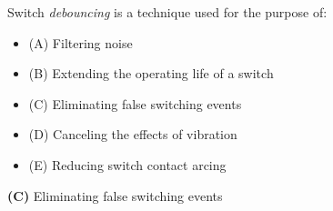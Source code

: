 

Switch {\it debouncing} is a technique used for the purpose of:

\begin{itemize}
\item{(A)} Filtering noise
\vskip 5pt 
\item{(B)} Extending the operating life of a switch
\vskip 5pt 
\item{(C)} Eliminating false switching events
\vskip 5pt 
\item{(D)} Canceling the effects of vibration
\vskip 5pt 
\item{(E)} Reducing switch contact arcing
\end{itemize}







{\bf (C)} Eliminating false switching events
 










